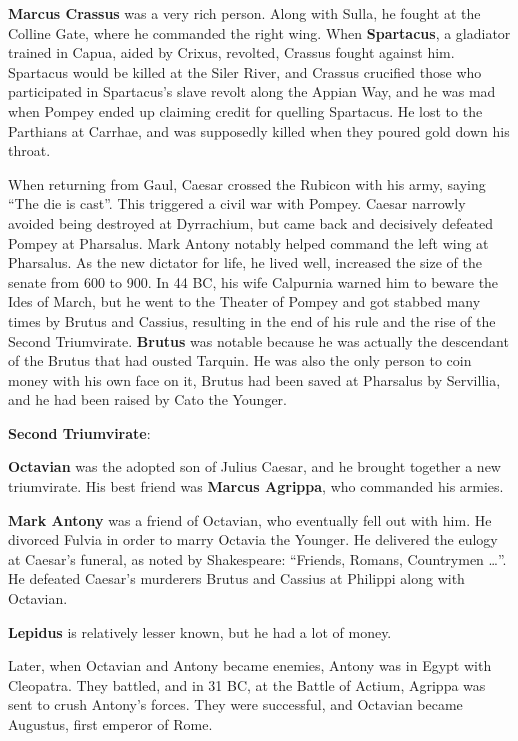 \textbf{Marcus Crassus} was a very rich person.
Along with Sulla, he fought at the Colline Gate, where he commanded the right wing.
When \textbf{Spartacus}, a gladiator trained in Capua, aided by Crixus, revolted, Crassus fought against him.
Spartacus would be killed at the Siler River, and
Crassus crucified those who participated in Spartacus's slave revolt along the Appian Way,
and he was mad when Pompey ended up claiming credit for quelling Spartacus.
He lost to the Parthians at Carrhae, and was supposedly killed when they poured gold down his throat.

When returning from Gaul, Caesar crossed the Rubicon with his army, saying ``The die is cast''.
This triggered a civil war with Pompey.
Caesar narrowly avoided being destroyed at Dyrrachium, but came back and decisively defeated Pompey at Pharsalus.
Mark Antony notably helped command the left wing at Pharsalus.
As the new dictator for life, he lived well, increased the size of the senate from 600 to 900.
In 44 BC, his wife Calpurnia warned him to beware the Ides of March,
but he went to the Theater of Pompey and got stabbed many times by Brutus and Cassius,
resulting in the end of his rule and the rise of the Second Triumvirate.
\textbf{Brutus} was notable because he was actually the descendant of the Brutus that had ousted Tarquin.
He was also the only person to coin money with his own face on it,
Brutus had been saved at Pharsalus by Servillia, and he had been raised by Cato the Younger.

\textbf{Second Triumvirate}:

\textbf{Octavian} was the adopted son of Julius Caesar, and he brought together a new triumvirate.
His best friend was \textbf{Marcus Agrippa}, who commanded his armies.

\textbf{Mark Antony} was a friend of Octavian, who eventually fell out with him.
He divorced Fulvia in order to marry Octavia the Younger.
He delivered the eulogy at Caesar's funeral, as noted by Shakespeare:
``Friends, Romans, Countrymen \ldots''.
He defeated Caesar's murderers Brutus and Cassius at Philippi along with Octavian.

\textbf{Lepidus} is relatively lesser known, but he had a lot of money.

Later, when Octavian and Antony became enemies, Antony was in Egypt with Cleopatra.
They battled, and in 31 BC, at the Battle of Actium, Agrippa was sent to crush Antony's forces.
They were successful, and Octavian became Augustus, first emperor of Rome.

